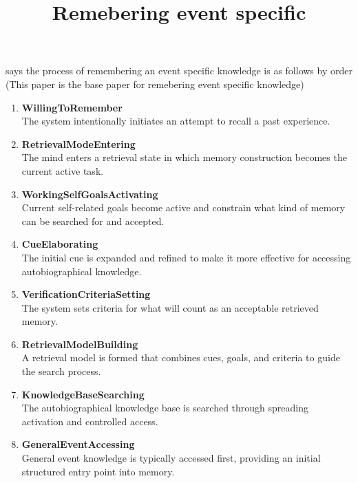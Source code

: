 \documentclass[a4paper]{article}
\title{Remebering event specific}
\date{}
\begin{document}
    \maketitle
    \cite{conway-2000-the-construction-of-autobiographical-memories-in-the-self-memory-system} says the process of remembering an event specific knowledge is as follows by order (This paper is the base paper for remebering event specific knowledge)
    \begin{enumerate}
        \item \textbf{WillingToRemember}\\
        The system intentionally initiates an attempt to recall a past experience.
        
        \item \textbf{RetrievalModeEntering}\\
        The mind enters a retrieval state in which memory construction becomes the current active task.
        
        \item \textbf{WorkingSelfGoalsActivating}\\
        Current self-related goals become active and constrain what kind of memory can be searched for and accepted.
        
        \item \textbf{CueElaborating}\\
        The initial cue is expanded and refined to make it more effective for accessing autobiographical knowledge.
        
        \item \textbf{VerificationCriteriaSetting}\\
        The system sets criteria for what will count as an acceptable retrieved memory.
        
        \item \textbf{RetrievalModelBuilding}\\
        A retrieval model is formed that combines cues, goals, and criteria to guide the search process.
        
        \item \textbf{KnowledgeBaseSearching}\\
        The autobiographical knowledge base is searched through spreading activation and controlled access.
        
        \item \textbf{GeneralEventAccessing}\\
        General event knowledge is typically accessed first, providing an initial structured entry point into memory.
        

\end{enumerate}
\end{document}
